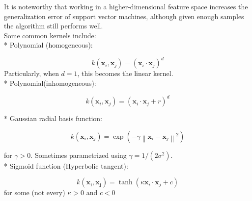 It is noteworthy that working in a higher-dimensional feature space increases the generalization error of support vector machines, although given enough samples the algorithm still performs well.\\

Some common kernels include: \\
* Polynomial (homogeneous):

\[k(\mathbf{x}_i, \mathbf{x}_j) = (\mathbf{x}_i \cdot \mathbf{x}_j)^d\]
Particularly, when \(d=1\), this becomes the linear kernel. \\

* Polynomial(inhomogeneous):

\[k(\mathbf{x}_i, \mathbf{x}_j) = (\mathbf{x}_i \cdot \mathbf{x}_j + r)^d\]

* Gaussian radial basis function:

\[k(\mathbf{x}_i, \mathbf{x}_j) = \exp\left(-\gamma \left\|\mathbf{x}_i - \mathbf{x}_j\right\|^2\right)\]

for \(\gamma > 0\). Sometimes parametrized using \(\gamma = 1/(2\sigma^2)\). \\

* Sigmoid function (Hyperbolic tangent):

\[k(\mathbf{x_i}, \mathbf{x_j}) = \tanh(\kappa \mathbf{x}_i \cdot \mathbf{x}_j + c)\]
for some (not every) \(\kappa > 0\) and \(c < 0\) \\




